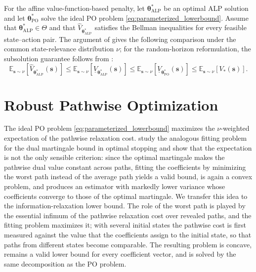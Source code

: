 \documentclass[11pt]{article}
\theoremstyle{definition}
\begin{document}
For the affine value-function-based penalty, let \(\boldsymbol\theta_{\mathrm{ALP}}^*\) be an optimal ALP solution and let \(\boldsymbol\theta_{\mathrm{PO}}^*\) solve the ideal PO problem \eqref{eq:parameterized_lowerbound}. Assume that \(\boldsymbol\theta_{\mathrm{ALP}}^*\in\Theta\) and that \(\hat V_{\boldsymbol\theta_{\mathrm{ALP}}^*}\) satisfies the Bellman inequalities for every feasible state--action pair. The argument of \citet[Theorems~4 and~5]{desai2012} gives the following comparison under the common state-relevance distribution \(\nu\); for the random-horizon reformulation, the subsolution guarantee follows from \citet[Proposition~4.1]{Brown2017or}:
\begin{equation}
\label{eq:alp_po_weighted_bound_comparison}
\mathbb E_{\boldsymbol s\sim\nu}\left[\hat V_{\boldsymbol\theta_{\mathrm{ALP}}^*}(\boldsymbol s)\right]\le\mathbb E_{\boldsymbol s\sim\nu}\left[\underline V_{\boldsymbol\theta_{\mathrm{ALP}}^*}(\boldsymbol s)\right]\le\mathbb E_{\boldsymbol s\sim\nu}\left[\underline V_{\boldsymbol\theta_{\mathrm{PO}}^*}(\boldsymbol s)\right]\le\mathbb E_{\boldsymbol s\sim\nu}\left[V_*(\boldsymbol s)\right].
\end{equation}

\section{Robust Pathwise Optimization}
\label{sec:Robust Pathwise Optimization}

The ideal PO problem \eqref{eq:parameterized_lowerbound} maximizes the \(\nu\)-weighted expectation of the pathwise relaxation cost. \citet{belomestny2019} study the analogous fitting problem for the dual martingale bound in optimal stopping and show that the expectation is not the only sensible criterion: since the optimal martingale makes the pathwise dual value constant across paths, fitting the coefficients by minimizing the worst path instead of the average path yields a valid bound, is again a convex problem, and produces an estimator with markedly lower variance whose coefficients converge to those of the optimal martingale. We transfer this idea to the information-relaxation lower bound. The role of the worst path is played by the essential infimum of the pathwise relaxation cost over revealed paths, and the fitting problem maximizes it; with several initial states the pathwise cost is first measured against the value that the coefficients assign to the initial state, so that paths from different states become comparable. The resulting problem is concave, remains a valid lower bound for every coefficient vector, and is solved by the same decomposition as the PO problem.
\end{document}
